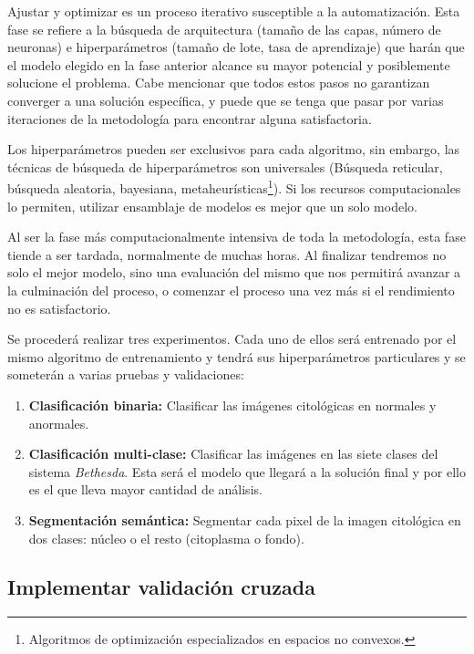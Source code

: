 Ajustar y optimizar es un proceso iterativo susceptible a la automatización.
Esta fase se refiere a la búsqueda de arquitectura (tamaño de las capas, número
de neuronas) e hiperparámetros (tamaño de lote, tasa de aprendizaje) que harán
que el modelo elegido en la fase anterior alcance su mayor potencial y
posiblemente solucione el problema. Cabe mencionar que todos estos pasos no
garantizan converger a una solución específica, y puede que se tenga que pasar
por varias iteraciones de la metodología para encontrar alguna satisfactoria.

Los hiperparámetros pueden ser exclusivos para cada algoritmo, sin embargo, las
técnicas de búsqueda de hiperparámetros son universales (Búsqueda reticular,
búsqueda aleatoria, bayesiana, metaheurísticas\footnote{Algoritmos de
optimización especializados en espacios no convexos.}). Si los recursos
computacionales lo permiten, utilizar ensamblaje de modelos es mejor que un solo
modelo.

Al ser la fase más computacionalmente intensiva de toda la metodología, esta
fase tiende a ser tardada, normalmente de muchas horas. Al finalizar tendremos
no solo el mejor modelo, sino una evaluación del mismo que nos permitirá avanzar
a la culminación del proceso, o comenzar el proceso una vez más si el
rendimiento no es satisfactorio.

Se procederá realizar tres experimentos. Cada uno de ellos será entrenado por el
mismo algoritmo de entrenamiento y tendrá sus hiperparámetros particulares y se
someterán a varias pruebas y validaciones:

\begin{enumerate}
    \item{\textbf{Clasificación binaria:}} Clasificar las imágenes citológicas
    en normales y anormales.
    \item{\textbf{Clasificación multi-clase:}} Clasificar las imágenes en las
    siete clases del sistema \emph{Bethesda}. Esta será el modelo que llegará a
    la solución final y por ello es el que lleva mayor cantidad de análisis.
    \item{\textbf{Segmentación semántica:}} Segmentar cada pixel de la imagen
    citológica en dos clases: núcleo o el resto (citoplasma o fondo).
\end{enumerate}

\subsection{Implementar validación cruzada}

